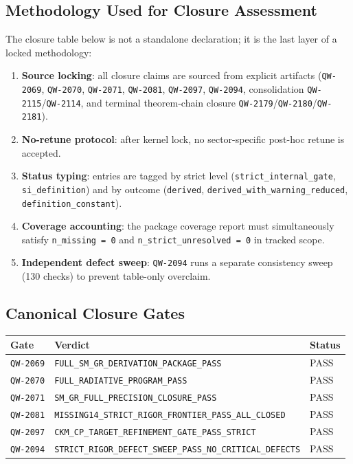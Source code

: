 \documentclass[11pt,a4paper]{article}
\newcommand{\QW}[1]{\texttt{QW-#1}}
\newcommand{\Verdict}[1]{\texttt{#1}}
\begin{document}
\subsection{Methodology Used for Closure Assessment}
The closure table below is not a standalone declaration; it is the last layer of a locked methodology:
\begin{enumerate}[leftmargin=1.5em]
    \item \textbf{Source locking}: all closure claims are sourced from explicit artifacts (\QW{2069}, \QW{2070}, \QW{2071}, \QW{2081}, \QW{2097}, \QW{2094}, consolidation \QW{2115}/\QW{2114}, and terminal theorem-chain closure \QW{2179}/\QW{2180}/\QW{2181}).
    \item \textbf{No-retune protocol}: after kernel lock, no sector-specific post-hoc retune is accepted.
    \item \textbf{Status typing}: entries are tagged by strict level (\texttt{strict\_internal\_gate}, \texttt{si\_definition}) and by outcome (\texttt{derived}, \texttt{derived\_with\_warning\_reduced}, \texttt{definition\_constant}).
    \item \textbf{Coverage accounting}: the package coverage report must simultaneously satisfy \texttt{n\_missing = 0} and \texttt{n\_strict\_unresolved = 0} in tracked scope.
    \item \textbf{Independent defect sweep}: \QW{2094} runs a separate consistency sweep (130 checks) to prevent table-only overclaim.
\end{enumerate}

\subsection{Canonical Closure Gates}
\begin{center}
\begin{tabular}{p{2.2cm}p{8.8cm}p{2.6cm}}
\toprule
\textbf{Gate} & \textbf{Verdict} & \textbf{Status} \\
\midrule
\QW{2069} & \Verdict{FULL\_SM\_GR\_DERIVATION\_PACKAGE\_PASS} & PASS \\
\QW{2070} & \Verdict{FULL\_RADIATIVE\_PROGRAM\_PASS} & PASS \\
\QW{2071} & \Verdict{SM\_GR\_FULL\_PRECISION\_CLOSURE\_PASS} & PASS \\
\QW{2081} & \Verdict{MISSING14\_STRICT\_RIGOR\_FRONTIER\_PASS\_ALL\_CLOSED} & PASS \\
\QW{2097} & \Verdict{CKM\_CP\_TARGET\_REFINEMENT\_GATE\_PASS\_STRICT} & PASS \\
\QW{2094} & \Verdict{STRICT\_RIGOR\_DEFECT\_SWEEP\_PASS\_NO\_CRITICAL\_DEFECTS} & PASS \\
\bottomrule
\end{tabular}
\end{center}
\end{document}
